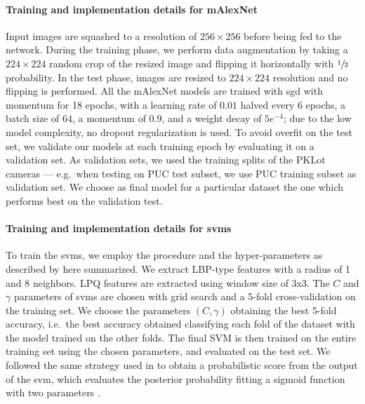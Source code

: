 \paragraph{Training and implementation details for mAlexNet}
Input images are squashed to a resolution of $256\times256$ before being fed to the network.
During the training phase, we perform data augmentation by taking a $224\times224$ random crop of the resized image and flipping it horizontally with $\sfrac{1}{2}$ probability.
In the test phase, images are resized to $224\times224$ resolution and no flipping is performed.
All the mAlexNet models are trained with \gls{sgd} with momentum for 18 epochs, with a learning rate of $0.01$ halved every 6 epochs, a batch size of $64$, a momentum of $0.9$, and a weight decay of $5e^{-4}$;
due to the low model complexity, no dropout regularization is used.
To avoid overfit on the test set, we validate our models at each training epoch by evaluating it on a validation set.
As validation sets, we used the training splits of the PKLot cameras --- e.g.\ when testing on PUC test subset, we use PUC training subset as validation set.
We choose as final model for a particular dataset the one which performs best on the validation test.

\paragraph{Training and implementation details for \glspl{svm}}
To train the \glspl{svm}, we employ the procedure and the hyper-parameters as described by \citet{de2015pklot} here summarized.
We extract LBP-type features with a radius of 1 and 8 neighbors.
LPQ features are extracted using window size of 3x3.
The $C$ and $\gamma$ parameters of \glspl{svm} are chosen with grid search and a 5-fold cross-validation on the training set.
We choose the parameters $(C,\gamma)$ obtaining the best 5-fold accuracy, i.e.\ the best accuracy obtained classifying each fold of the dataset with the model trained on the other folds.
The final SVM is then trained on the entire training set using the chosen parameters, and evaluated on the test set.
We followed the same strategy used in \cite{de2015pklot} to obtain a probabilistic score from the output of the \gls{svm}, which evaluates the posterior probability fitting a sigmoid function with two parameters \cite{platt1999probabilistic}.

